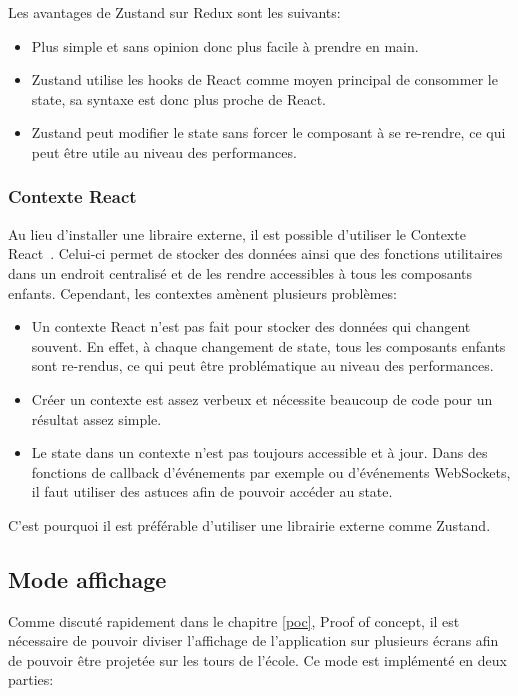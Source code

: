 Les avantages de Zustand sur Redux sont les suivants:
\begin{itemize}
  \item Plus simple et sans opinion donc plus facile à prendre en main.
  \item Zustand utilise les hooks de React comme moyen principal de consommer le state, sa syntaxe est donc plus proche de React.
  \item Zustand peut modifier le state sans forcer le composant à se re-rendre, ce qui peut être utile au niveau des performances.
\end{itemize}

\subsubsection{Contexte React}

Au lieu d'installer une libraire externe, il est possible d'utiliser le Contexte React~\cite{react-context}. Celui-ci permet de stocker des données ainsi que des fonctions utilitaires dans un endroit centralisé et de les rendre accessibles à tous les composants enfants. Cependant, les contextes amènent plusieurs problèmes:

\begin{itemize}
  \item Un contexte React n'est pas fait pour stocker des données qui changent souvent. En effet, à chaque changement de state, tous les composants enfants sont re-rendus, ce qui peut être problématique au niveau des performances.
  \item Créer un contexte est assez verbeux et nécessite beaucoup de code pour un résultat assez simple.
  \item Le state dans un contexte n'est pas toujours accessible et à jour. Dans des fonctions de callback d'événements par exemple ou d'événements WebSockets, il faut utiliser des astuces afin de pouvoir accéder au state.
\end{itemize}

C'est pourquoi il est préférable d'utiliser une librairie externe comme Zustand.

\subsection{Mode affichage}
\label{display-mode}

Comme discuté rapidement dans le chapitre \ref{poc}, Proof of concept, il est nécessaire de pouvoir diviser l'affichage de l'application sur plusieurs écrans afin de pouvoir être projetée sur les tours de l'école. Ce mode est implémenté en deux parties:

